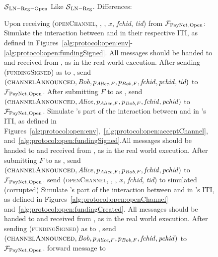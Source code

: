 \begin{figure}[H]
  \begin{simulatorbox}{$\mathcal{S}{}_{\mathrm{LN - Reg - Open}}$}
    Like $\mathcal{S}{}_{\mathrm{LN - Reg}}$. Differences:
    \begin{algorithmic}[1]
      \State Upon receiving (\textsc{openChannel}, \alice, \bob, $x$,
      \textit{fchid}, \textit{tid}) from $\mathcal{F}_{\mathrm{PayNet}}{}_{\mathrm{, Open}}$:
      \Indent
          \State Simulate the interaction between \alice{} and \bob{} in their
          respective ITI, as defined in
          Figures~\ref{alg:protocol:open:env}-\ref{alg:protocol:open:fundingSigned}.
          All messages should be handed to and received from \adversary, as in
          the real world execution.
          \State After sending (\textsc{fundingSigned}) as \bob{} to \alice,
          send $\left(\textsc{channelAnnounced}, \mathit{Bob}, p_{\mathit{Alice}, F}, p_{\mathit{Bob},
          F}, \mathit{fchid}, \mathit{pchid}, \textit{tid}\right)$ to
          $\mathcal{F}_{\mathrm{PayNet}}{}_{\mathrm{, Open}}$.
          \label{alg:sim:open:announced:bob:bothhonest}
          \State After submitting $F$ to \ledger{} as \alice, send
          $\left(\textsc{channelAnnounced}, \mathit{Alice}, p_{\mathit{Alice}, F}, p_{\mathit{Bob},
          F}, \mathit{fchid}, \mathit{pchid}\right)$ to $\mathcal{F}_{\mathrm{PayNet}}{}_{\mathrm{,
          Open}}$.
          \label{alg:sim:open:announced:alice:bothhonest}
          \State Simulate \alice's part of the interaction between \alice{}
          and \bob{} in \alice's ITI, as defined in
          Figures~\ref{alg:protocol:open:env},~\ref{alg:protocol:open:acceptChannel},
          and~\ref{alg:protocol:open:fundingSigned}.All messages should be
          handed to and received from \adversary, as in the real world
          execution.
          \State After submitting $F$ to \ledger{} as \alice, send
          $\left(\textsc{channelAnnounced}, \mathit{Alice}, p_{\mathit{Alice}, F}, p_{\mathit{Bob},
          F}, \mathit{fchid}, \mathit{pchid}\right)$ to $\mathcal{F}_{\mathrm{PayNet}}{}_{\mathrm{,
          Open}}$.
          \label{alg:sim:open:announced:alice:alicehonest}
          \State send (\textsc{openChannel}, \alice, \bob, $x$,
          \textit{fchid}, \textit{tid}) to simulated (corrupted) \alice
          \State Simulate \bob's part of the interaction between \alice{}
          and \bob{} in \bob's ITI, as defined in
          Figures~\ref{alg:protocol:open:openChannel}
          and~\ref{alg:protocol:open:fundingCreated}.
          All messages should be handed to and received from \adversary, as in
          the real world execution.
          \State After sending (\textsc{fundingSigned}) as \bob{} to \alice,
          send $\left(\textsc{channelAnnounced}, \mathit{Bob}, p_{\mathit{Alice}, F}, p_{\mathit{Bob},
          F}, \mathit{fchid}, \mathit{pchid}\right)$ to $\mathcal{F}_{\mathrm{PayNet}}{}_{\mathrm{,
          Open}}$.
          \label{alg:sim:open:announced:bob:bobhonest}
          \State forward message to \adversary{} 
        \EndIf
      \EndIndent
      \Statex


\end{algorithmic}
\end{simulatorbox}
\end{figure}
